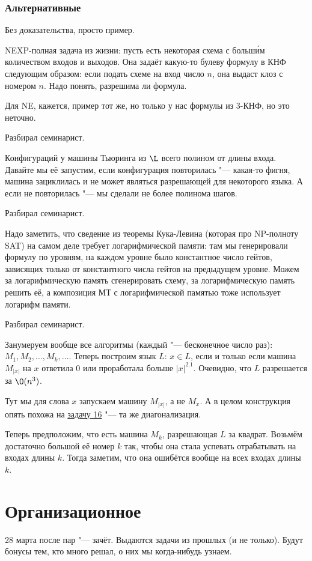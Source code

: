 	\subsubsection{Альтернативные}
		Без доказательства, просто пример.

		NEXP-полная задача из жизни: пусть есть некоторая схема с больш\'им количеством входов и выходов.
		Она задаёт какую-то булеву формулу в КНФ следующим образом: если подать схеме на вход число $n$,
		она выдаст клоз с номером $n$.
		Надо понять, разрешима ли формула.

		Для NE, кажется, пример тот же, но только у нас формулы из 3-КНФ, но это неточно.

	Разбирал семинарист.

	Конфигураций у машины Тьюринга из $\L$ всего полином от длины входа.
	Давайте мы её запустим, если конфигурация повторилась "--- какая-то фигня, машина зациклилась и не может являться разрешающей для некоторого языка.
	А если не повторилась "--- мы сделали не более полинома шагов.

	Разбирал семинарист.

	Надо заметить, что сведение из теоремы Кука-Левина (которая про NP-полноту SAT) на самом деле требует логарифмической памяти:
	там мы генерировали формулу по уровням, на каждом уровне было константное число гейтов,
	зависящих только от константного числа гейтов на предыдущем уровне.
	Можем за логарифмическую память сгенерировать схему, за логарифмическую память решить её, а композиция МТ
	с логарифмической памятью тоже использует логарифм памяти.

	Разбирал семинарист.

	Занумеруем вообще все алгоритмы (каждый "--- бесконечное число раз): $M_1, M_2, \dots, M_k, \dots$.
	Теперь построим язык $L$: $x \in L$, если и только если машина $M_{|x|}$ на $x$ ответила 0 или проработала
	больше $|x|^{2.1}$.
	Очевидно, что $L$ разрешается за $\O(n^3)$.
	\begin{Rem}
		Тут мы для слова $x$ запускаем машину $M_{|x|}$, а не $M_x$.
		А в целом конструкция опять похожа на \hyperref[prob16]{задачу 16} "--- та же диагонализация.
	\end{Rem}

	Теперь предположим, что есть машина $M_k$, разрешающая $L$ за квадрат.
	Возьмём достаточно большой её номер $k$ так, чтобы она стала успевать отрабатывать на входах длины $k$.
	Тогда заметим, что она ошибётся вообще на всех входах длины $k$.

\section{Организационное}
	28 марта после пар "--- зачёт.
	Выдаются задачи из прошлых (и не только).
	Будут бонусы тем, кто много решал, о них мы когда-нибудь узнаем.
